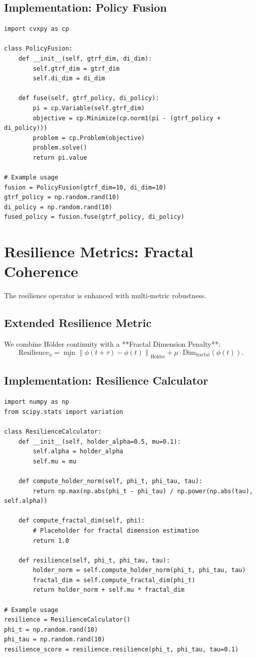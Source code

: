 \documentclass[12pt]{article}
\begin{document}
\subsection{Implementation: Policy Fusion}
\begin{verbatim}
import cvxpy as cp

class PolicyFusion:
    def __init__(self, gtrf_dim, di_dim):
        self.gtrf_dim = gtrf_dim
        self.di_dim = di_dim
    
    def fuse(self, gtrf_policy, di_policy):
        pi = cp.Variable(self.gtrf_dim)
        objective = cp.Minimize(cp.norm1(pi - (gtrf_policy + di_policy)))
        problem = cp.Problem(objective)
        problem.solve()
        return pi.value

# Example usage
fusion = PolicyFusion(gtrf_dim=10, di_dim=10)
gtrf_policy = np.random.rand(10)
di_policy = np.random.rand(10)
fused_policy = fusion.fuse(gtrf_policy, di_policy)
\end{verbatim}

\section{Resilience Metrics: Fractal Coherence}
The resilience operator is enhanced with multi-metric robustness.

\subsection{Extended Resilience Metric}
We combine Hölder continuity with a **Fractal Dimension Penalty**:
\[
\text{Resilience}_\phi = \min_{\tau} \left\| \phi(t+\tau) - \phi(t) \right\|_{\text{Hölder}} + \mu \cdot \text{Dim}_{\text{fractal}}(\phi(t)).
\]

\subsection{Implementation: Resilience Calculator}
\begin{verbatim}
import numpy as np
from scipy.stats import variation

class ResilienceCalculator:
    def __init__(self, holder_alpha=0.5, mu=0.1):
        self.alpha = holder_alpha
        self.mu = mu
    
    def compute_holder_norm(self, phi_t, phi_tau, tau):
        return np.max(np.abs(phi_t - phi_tau) / np.power(np.abs(tau), self.alpha))
    
    def compute_fractal_dim(self, phi):
        # Placeholder for fractal dimension estimation
        return 1.0
    
    def resilience(self, phi_t, phi_tau, tau):
        holder_norm = self.compute_holder_norm(phi_t, phi_tau, tau)
        fractal_dim = self.compute_fractal_dim(phi_t)
        return holder_norm + self.mu * fractal_dim

# Example usage
resilience = ResilienceCalculator()
phi_t = np.random.rand(10)
phi_tau = np.random.rand(10)
resilience_score = resilience.resilience(phi_t, phi_tau, tau=0.1)
\end{verbatim}
\end{document}
